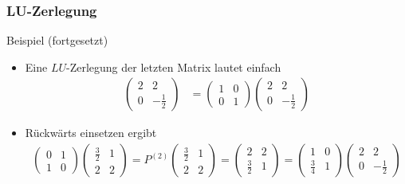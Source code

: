 \documentclass{beamer}
\renewcommand{\ae}{\"a}
\newcommand{\ue}{\"u}
\newcommand{\mytitle}{LU-Zerlegung}
\begin{document}
\begin{frame}\frametitle{\mytitle}
	\begin{block}{Beispiel (fortgesetzt)}
		\begin{itemize}
			\item Eine $LU$-Zerlegung der letzten Matrix lautet einfach
				\begin{align*}
					\begin{pmatrix} 2&2\\0&-\frac{1}{2} \end{pmatrix}&=\begin{pmatrix} 1&0\\0&1 \end{pmatrix}\begin{pmatrix}2&2\\0&-\frac{1}{2}\end{pmatrix}
				\end{align*}
			\item R\ue ckw\ae rts einsetzen ergibt
				\begin{align*}
\begin{pmatrix}0&1\\1&0\end{pmatrix}\begin{pmatrix} \frac{3}{2}&1\\2&2 \end{pmatrix}
=	P^{(2)}\begin{pmatrix} \frac{3}{2}&1\\2&2 \end{pmatrix}=\begin{pmatrix} 2&2\\\frac{3}{2}&1 \end{pmatrix}=\begin{pmatrix} 1&0\\\frac{3}{4}&1 \end{pmatrix}\begin{pmatrix}2&2\\0&-\frac{1}{2}\end{pmatrix}
				\end{align*}
		\end{itemize}
	\end{block}
\end{frame}
\end{document}
